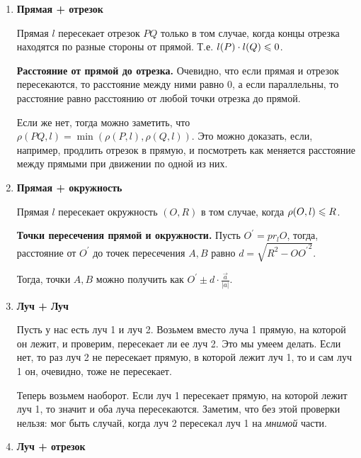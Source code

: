 \begin{enumerate}
    \textbf{Точка пересечения прямой и луча.} Если $t \Ge 0$, то точку пересечения можно найти просто подставив это значение в уравнение луча. Если же $t < 0$, то существует только \textit{мнимая} точка пересечения.
    
    \item \textbf{Прямая + отрезок}

    Прямая $l$ пересекает отрезок $PQ$ только в том случае, когда концы отрезка находятся по разные стороны от прямой. Т.е. $l(P)\cdot l(Q) \leqslant 0$.

    \textbf{Расстояние от прямой до отрезка.} Очевидно, что если прямая и отрезок пересекаются, то расстояние между ними равно 0, а если параллельны, то  расстояние равно расстоянию от любой точки отрезка до прямой.

    Если же нет, тогда можно заметить, что $\rho(PQ, l) = \min(\rho(P, l), \rho(Q, l))$. Это можно доказать, если, например, продлить отрезок в прямую, и посмотреть как меняется расстояние между прямыми при движении по одной из них.
    
    \item \textbf{Прямая + окружность}

    Прямая $l$ пересекает окружность $(O, R)$ в том случае, когда $\rho(O, l) \leqslant R$.

    \textbf{Точки пересечения прямой и окружности.} Пусть $O^{'} = pr_{l}O$, тогда, расстояние от $O^{'}$ до точек пересечения $A, B$ равно $d = \sqrt{R^2 - {OO^{'}}^2}$.
    
    Тогда, точки $A, B$ можно получить как $\displaystyle O^{'} \pm d \cdot \frac{\Vec{a}}{|a|}$.

    
    \item \textbf{Луч + Луч}

    Пусть у нас есть луч 1 и луч 2. Возьмем вместо луча 1 прямую, на которой он лежит, и проверим, пересекает ли ее луч 2. Это мы умеем делать. Если нет, то раз луч 2 не пересекает прямую, в которой лежит луч 1, то и сам луч 1 он, очевидно, тоже не пересекает.
    
    Теперь возьмем наоборот. Если луч 1 пересекает прямую, на которой лежит луч 1, то значит и оба луча пересекаются. Заметим, что без этой проверки нельзя: мог быть случай, когда луч 2 пересекал луч 1 на \textit{мнимой} части.

    \item \textbf{Луч + отрезок}


\end{enumerate}
